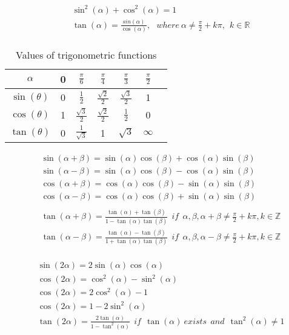 \documentclass[preview,convert={density=300,outext=.png}]{standalone}
\begin{document}
\begin{align*}
    & \sin^2(\alpha) + \cos^2(\alpha) = 1 \\
    & \tan(\alpha) = \frac{sin(\alpha)}{\cos(\alpha)}, \ \ \  where  \ \alpha \not = \frac{\pi}{2} + k\pi, \ \ k \in \mathbb{R} \\
\end{align*}

\begin{table}[ht]
\centering
\begin{tabular}{|c|c|c|c|c|c|c}
\hline
$\alpha$ & 0 & $\frac{\pi}{6}$ & $\frac{\pi}{4}$ & $\frac{\pi}{3}$ & $\frac{\pi}{2}$ \\
\hline
$\sin(\theta)$ & 0 & $\frac{1}{2}$ & $\frac{\sqrt{2}}{2}$ & $\frac{\sqrt{3}}{2}$ & 1 \\
\hline
$\cos(\theta)$ & 1 & $\frac{\sqrt{3}}{2}$ & $\frac{\sqrt{2}}{2}$ & $\frac{1}{2}$ & 0 \\
\hline
$\tan(\theta)$ & 0 & $\frac{1}{\sqrt{3}}$ & 1 & $\sqrt{3}$ & $\infty$ \\
\hline


\end{tabular}
\caption{Values of trigonometric functions}
\end{table}


\begin{align*}
    & \sin(\alpha + \beta) = \sin(\alpha)\cos(\beta) + \cos(\alpha)\sin(\beta) \\
    & \sin(\alpha - \beta) = \sin(\alpha)\cos(\beta) - \cos(\alpha)\sin(\beta) \\
    & \cos(\alpha + \beta) = \cos(\alpha)\cos(\beta) - \sin(\alpha)\sin(\beta) \\
    & \cos(\alpha - \beta) = \cos(\alpha)\cos(\beta) + \sin(\alpha)\sin(\beta) \\
    & \\
    & \tan(\alpha + \beta) = \frac{\tan(\alpha) + \tan(\beta)}{1 - \tan(\alpha)\tan(\beta)} \ \ if \ \ \alpha, \beta, \alpha + \beta \not = \frac{\pi}{2} + k\pi, k \in \mathbb{Z}\\
    & \tan(\alpha - \beta) = \frac{\tan(\alpha) - \tan(\beta)}{1 + \tan(\alpha)\tan(\beta)} \ \ if \ \ \alpha, \beta, \alpha - \beta \not = \frac{\pi}{2} + k\pi, k \in \mathbb{Z}\\
\end{align*}

\begin{align*}
    & \sin(2\alpha) = 2\sin(\alpha)\cos(\alpha) \\
    & \cos(2\alpha) = \cos^2(\alpha) - \sin^2(\alpha) \\
    & \cos(2\alpha) = 2\cos^2(\alpha) - 1 \\
    & \cos(2\alpha) = 1 - 2\sin^2(\alpha) \\
    & \tan(2\alpha) = \frac{2\tan(\alpha)}{1 - \tan^2(\alpha)} \ \ if \ \ \tan(\alpha) \ exists \ \ and \ \ \tan^2(\alpha) \not = 1 \\
\end{align*}
\end{document}
